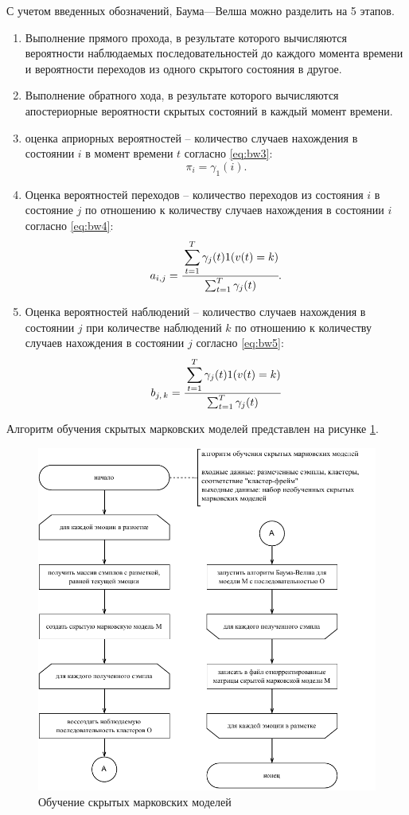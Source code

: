 С учетом введенных обозначений, Баума---Велша можно разделить на 5 этапов.
\begin{enumerate}
	\item Выполнение прямого прохода, в результате которого вычисляются вероятности наблюдаемых последовательностей до каждого момента времени и вероятности переходов из одного скрытого состояния в другое.
	\item Выполнение обратного хода, в результате которого вычисляются апостериорные вероятности скрытых состояний в каждый момент времени.
	\item оценка априорных вероятностей -- количество случаев нахождения в состоянии $i$ в момент времени $t$ согласно \ref{eq:bw3}:
	\begin{equation}\label{eq:bw3}
		\pi_i = \gamma_1(i).
	\end{equation}
	\item  Оценка вероятностей переходов -- количество переходов из состояния  $i$ в состояние $j$ по отношению к количеству случаев нахождения в состоянии $i$ согласно \ref{eq:bw4}:
	\begin{equation}\label{eq:bw4}
		a_{i, j} = \cfrac{\displaystyle\sum_{t=1}^T \gamma_j(t) 1(v(t)=k)}{\sum_{t=1}^T \gamma_j(t)}.
	\end{equation}
	\item Оценка вероятностей наблюдений -- количество случаев нахождения в состоянии $j$ при количестве наблюдений $k$ по отношению к количеству случаев нахождения в состоянии $j$ согласно \ref{eq:bw5}:
	\begin{equation}\label{eq:bw5}
		b_{j,\,k} = \cfrac{\displaystyle\sum_{t=1}^T \gamma_j(t) 1(v(t)=k)}{\sum_{t=1}^T \gamma_j(t) }
	\end{equation}
\end{enumerate}
Алгоритм обучения скрытых марковских моделей представлен на рисунке \ref{fig:hmm-train}.
\begin{figure}[H]
	\centering
	\includegraphics[width=0.8\linewidth]{assets/hmm-train}
	\caption{Обучение скрытых марковских моделей}
	\label{fig:hmm-train}
\end{figure}

